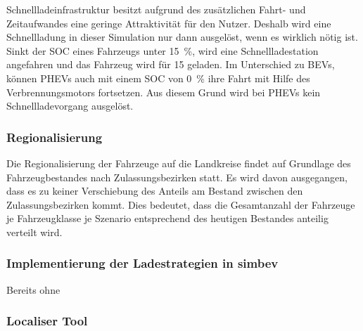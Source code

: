 

Schnellladeinfrastruktur besitzt aufgrund des zusätzlichen Fahrt- und Zeitaufwandes eine geringe Attraktivität für den Nutzer.
Deshalb wird eine Schnellladung in dieser Simulation nur dann ausgelöst, wenn es wirklich nötig ist.
Sinkt der \gls{SOC} eines Fahrzeugs unter \SI{15}{\percent}, wird eine Schnellladestation angefahren und das Fahrzeug wird für \SI{15}{\Minuten} geladen.
Im Unterschied zu \glspl{BEV}, können \glspl{PHEV} auch mit einem \gls{SOC} von \SI{0}{\percent} ihre Fahrt mit Hilfe des Verbrennungsmotors fortsetzen.
Aus diesem Grund wird bei \glspl{PHEV} kein Schnellladevorgang ausgelöst.\medskip

\subsubsection{Regionalisierung}

Die Regionalisierung der Fahrzeuge auf die Landkreise findet auf Grundlage des Fahrzeugbestandes nach Zulassungsbezirken \cite[][Stand: ]{KBAPLZ2020} statt.
Es wird davon ausgegangen, dass es zu keiner Verschiebung des Anteils am Bestand zwischen den Zulassungsbezirken kommt.
Dies bedeutet, dass die Gesamtanzahl der Fahrzeuge je Fahrzeugklasse je Szenario entsprechend des heutigen Bestandes anteilig verteilt wird.

\subsubsection{Implementierung der Ladestrategien in simbev}

Bereits ohne 


\subsubsection{Localiser Tool}